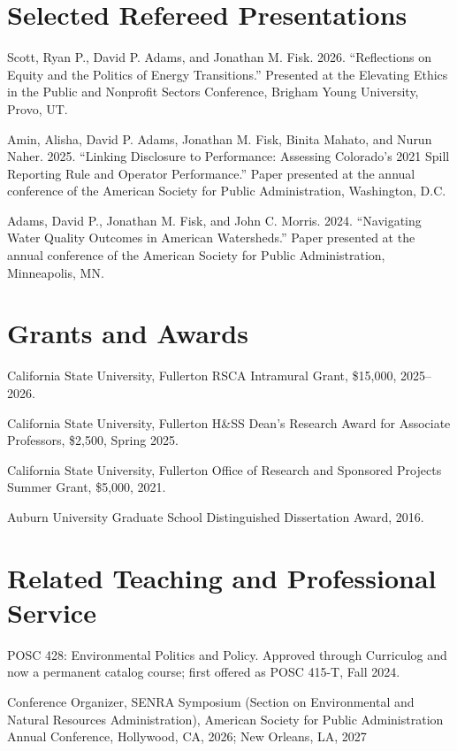 \documentclass[10pt,letterpaper]{article}
\renewenvironment{itemize}{
  \begin{list}{}{
    \setlength{\leftmargin}{1.5em}
    \setlength{\itemsep}{0.08em}
    \setlength{\parskip}{0pt}
    \setlength{\parsep}{0.08em}
  }
}{
  \end{list}
}
\begin{document}
\section*{Selected Refereed Presentations}
\begin{itemize}\leftmargin=2pt\itemindent=-15pt
  \item Scott, Ryan P., David P. Adams, and Jonathan M. Fisk. 2026. ``Reflections on Equity and the Politics of Energy Transitions.'' Presented at the Elevating Ethics in the Public and Nonprofit Sectors Conference, Brigham Young University, Provo, UT.
  \item Amin, Alisha, David P. Adams, Jonathan M. Fisk, Binita Mahato, and Nurun Naher. 2025. ``Linking Disclosure to Performance: Assessing Colorado's 2021 Spill Reporting Rule and Operator Performance.'' Paper presented at the annual conference of the American Society for Public Administration, Washington, D.C.
  \item Adams, David P., Jonathan M. Fisk, and John C. Morris. 2024. ``Navigating Water Quality Outcomes in American Watersheds.'' Paper presented at the annual conference of the American Society for Public Administration, Minneapolis, MN.
\end{itemize}

\section*{Grants and Awards}
\begin{itemize}\leftmargin=2pt\itemindent=-15pt
  \item California State University, Fullerton RSCA Intramural Grant, \$15,000, 2025--2026.
  \item California State University, Fullerton H\&SS Dean's Research Award for Associate Professors, \$2,500, Spring 2025.
  \item California State University, Fullerton Office of Research and Sponsored Projects Summer Grant, \$5,000, 2021.
  \item Auburn University Graduate School Distinguished Dissertation Award, 2016.
\end{itemize}

\section*{Related Teaching and Professional Service}
\begin{itemize}\leftmargin=2pt\itemindent=-15pt
  \item POSC 428: Environmental Politics and Policy. Approved through Curriculog and now a permanent catalog course; first offered as POSC 415-T, Fall 2024.
  \item Conference Organizer, SENRA Symposium (Section on Environmental and Natural Resources Administration), American Society for Public Administration Annual Conference, Hollywood, CA, 2026; New Orleans, LA, 2027
\end{itemize}
\end{document}

